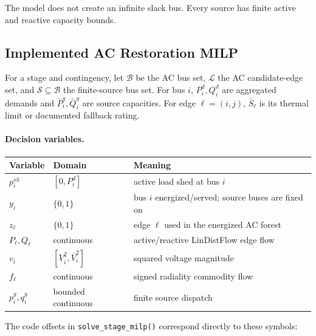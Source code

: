 The model does not create an infinite slack bus.  Every source has finite active
and reactive capacity bounds.

\subsection{Implemented AC Restoration MILP}
\label{sec:3stage-implemented-milp}

For a stage and contingency, let $\mathcal{B}$ be the AC bus set,
$\mathcal{L}$ the AC candidate-edge set, and
$\mathcal{S}\subseteq\mathcal{B}$ the finite-source bus set.  For bus $i$,
$P^d_i,Q^d_i$ are aggregated demands and
$\bar P^g_i,\bar Q^g_i$ are source capacities.  For edge
$\ell=(i,j)$, $\bar S_\ell$ is its thermal limit or documented fallback rating.

\paragraph{Decision variables.}
\begin{center}
\begin{tabular}{lll}
\hline
Variable & Domain & Meaning \\
\hline
$p^{sh}_i$ & $[0,P^d_i]$ & active load shed at bus $i$ \\
$y_i$ & $\{0,1\}$ & bus $i$ energized/served; source buses are fixed on \\
$z_\ell$ & $\{0,1\}$ & edge $\ell$ used in the energized AC forest \\
$P_\ell,Q_\ell$ & continuous & active/reactive LinDistFlow edge flow \\
$v_i$ & $[\underline V_i^2,\overline V_i^2]$ & squared voltage magnitude \\
$f_\ell$ & continuous & signed radiality commodity flow \\
$p^g_i,q^g_i$ & bounded continuous & finite source dispatch \\
\hline
\end{tabular}
\end{center}

The code offsets in \texttt{solve\_stage\_milp()} correspond directly to these
symbols:

